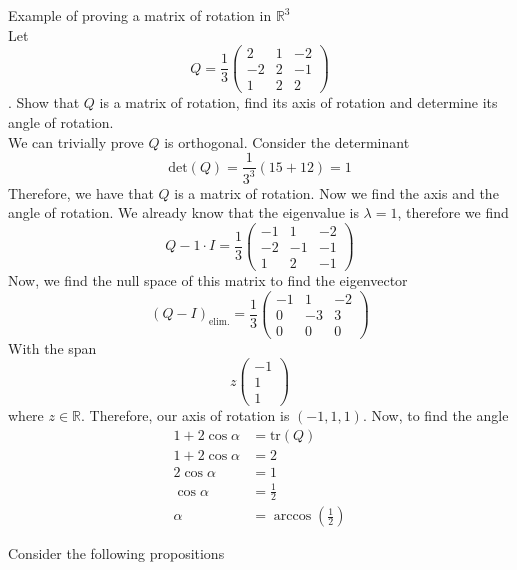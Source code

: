 \documentclass[journal, letterpaper]{IEEEtran}
\begin{document}
    \begin{myboxg}{Example of proving a matrix of rotation in $\mathbb{R}^3$} \\ 
        Let 
        $$ Q = \frac{1}{3}\begin{pmatrix}
            2 & 1 & -2 \\ -2 & 2 & -1 \\ 1 & 2 & 2
        \end{pmatrix}$$. Show that $Q$ is a matrix of rotation, find its axis of rotation and determine its angle of rotation.
        \newline \\ 
        We can trivially prove $Q$ is orthogonal. Consider the determinant
        $$\text{det}(Q) = \frac{1}{3^3}(15 + 12) = 1 $$
        Therefore, we have that $Q$ is a matrix of rotation. Now we find the axis and the angle of rotation. We already know 
        that the eigenvalue is $\lambda = 1$, therefore we find
        $$ Q - 1 \cdot I =\frac{1}{3}\begin{pmatrix}
            -1 & 1 & -2 \\ -2 & -1 & -1 \\ 1 & 2 & -1
        \end{pmatrix} $$
        Now, we find the null space of this matrix to find the eigenvector
        $$ (Q - I)_{\text{elim.}} = \frac{1}{3}\begin{pmatrix}
            -1 & 1 & -2 \\ 0 & -3 & 3 \\ 0 & 0 & 0
        \end{pmatrix}$$
        With the span 
        $$ z\begin{pmatrix}
            -1 \\ 1 \\ 1
        \end{pmatrix}$$
        where $z \in \mathbb{R}$. Therefore, our axis of rotation is $(-1, 1, 1)$. Now, to find the angle
        \begin{align*}
            1 + 2\cos\alpha &= \text{tr}(Q) \\ 
            1 + 2\cos\alpha &= 2 \\ 
            2\cos\alpha &= 1 \\
            \cos\alpha &= \frac{1}{2} \\
            \alpha &= \arccos\left( \frac{1}{2}\right) 
        \end{align*}
    \end{myboxg}
    Consider the following propositions
\end{document}
